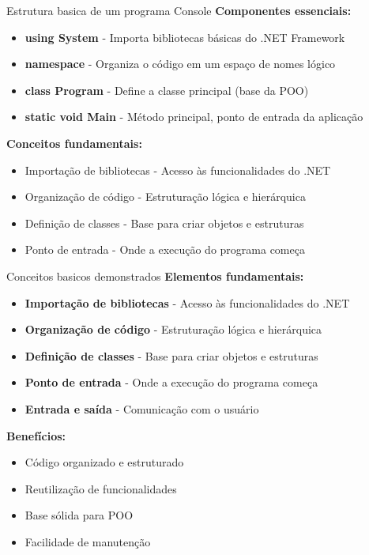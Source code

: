 \documentclass[aspectratio=169]{beamer}
\begin{document}
\begin{frame}{Estrutura basica de um programa Console}
\textbf{Componentes essenciais:}
\begin{itemize}
    \item \textbf{using System} - Importa bibliotecas básicas do .NET Framework
    \item \textbf{namespace} - Organiza o código em um espaço de nomes lógico
    \item \textbf{class Program} - Define a classe principal (base da POO)
    \item \textbf{static void Main} - Método principal, ponto de entrada da aplicação
\end{itemize}

\textbf{Conceitos fundamentais:}
\begin{itemize}
    \item Importação de bibliotecas - Acesso às funcionalidades do .NET
    \item Organização de código - Estruturação lógica e hierárquica
    \item Definição de classes - Base para criar objetos e estruturas
    \item Ponto de entrada - Onde a execução do programa começa
\end{itemize}
\end{frame}

\begin{frame}{Conceitos basicos demonstrados}
\textbf{Elementos fundamentais:}
\begin{itemize}
    \item \textbf{Importação de bibliotecas} - Acesso às funcionalidades do .NET
    \item \textbf{Organização de código} - Estruturação lógica e hierárquica
    \item \textbf{Definição de classes} - Base para criar objetos e estruturas
    \item \textbf{Ponto de entrada} - Onde a execução do programa começa
    \item \textbf{Entrada e saída} - Comunicação com o usuário
\end{itemize}

\textbf{Benefícios:}
\begin{itemize}
    \item Código organizado e estruturado
    \item Reutilização de funcionalidades
    \item Base sólida para POO
    \item Facilidade de manutenção
\end{itemize}
\end{frame}
\end{document}

